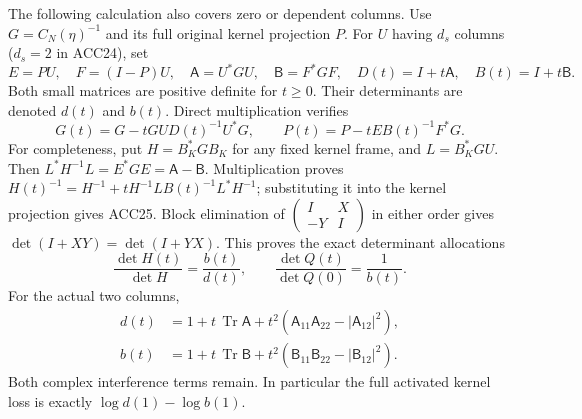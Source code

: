 \documentclass[11pt]{article}
\begin{document}
The following calculation also covers zero or dependent columns.
Use \(G=C_N(\eta)^{-1}\) and its full original kernel projection \(P\).
For \(U\) having \(d_s\) columns (\(d_s=2\) in ACC24), set
\[
E=PU,\quad F=(I-P)U,\quad
\mathsf A=U^*GU,\quad\mathsf B=F^*GF,\quad
D(t)=I+t\mathsf A,\quad B(t)=I+t\mathsf B.
\]
Both small matrices are positive definite for \(t\ge0\).
Their determinants are denoted \(d(t)\) and \(b(t)\). Direct
multiplication verifies
\begin{equation}\tag{ACC25}
G(t)=G-tGU D(t)^{-1}U^*G,\qquad
P(t)=P-tE B(t)^{-1}F^*G.
\end{equation}
For completeness, put \(H=B_K^*GB_K\) for any fixed kernel frame,
and \(L=B_K^*GU\). Then \(L^*H^{-1}L=E^*GE=\mathsf A-\mathsf B\).
Multiplication proves
\(H(t)^{-1}=H^{-1}+tH^{-1}L B(t)^{-1}L^*H^{-1}\);
substituting it into the kernel projection gives ACC25.
Block elimination of
\(\left(\begin{smallmatrix}I&X\\-Y&I\end{smallmatrix}\right)\)
in either order gives \(\det(I+XY)=\det(I+YX)\).
This proves the exact determinant allocations
\begin{equation}\tag{ACC26}
\frac{\det H(t)}{\det H}=\frac{b(t)}{d(t)},\qquad
\frac{\det Q(t)}{\det Q(0)}=\frac1{b(t)}.
\end{equation}
For the actual two columns,
\begin{equation}\tag{ACC27}
\begin{aligned}
d(t)&=1+t\,\operatorname{Tr}\mathsf A
+t^2(\mathsf A_{11}\mathsf A_{22}-|\mathsf A_{12}|^2),\\
b(t)&=1+t\,\operatorname{Tr}\mathsf B
+t^2(\mathsf B_{11}\mathsf B_{22}-|\mathsf B_{12}|^2).
\end{aligned}
\end{equation}
Both complex interference terms remain. In particular the full
activated kernel loss is exactly \(\log d(1)-\log b(1)\).
\end{document}
